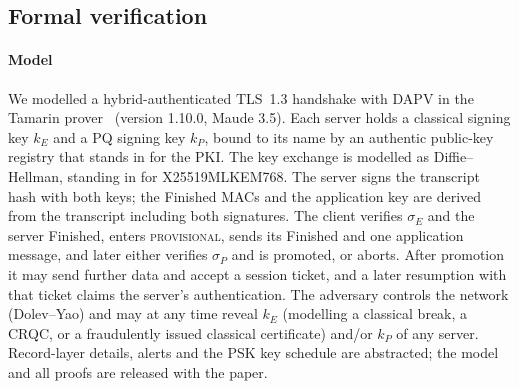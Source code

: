 \documentclass[preprint,10pt,3p]{elsarticle}
\newcommand{\state}[1]{\textsc{#1}}
\begin{document}
\subsection{Formal verification}
\label{sec:formal}

\paragraph{Model} We modelled a hybrid-authenticated TLS~1.3 handshake
with DAPV in the Tamarin prover~\cite{Tamarin2013} (version 1.10.0, Maude
3.5).  Each server holds a classical signing key $k_E$ and a PQ signing key
$k_P$, bound to its name by an authentic public-key registry that stands in
for the PKI.  The key exchange is modelled as Diffie--Hellman, standing in
for X25519MLKEM768.  The server signs the transcript hash with both keys;
the Finished MACs and the application key are derived from the transcript
including both signatures.  The client verifies $\sigma_E$ and the server
Finished, enters \state{provisional}, sends its Finished and one
application message, and later either verifies $\sigma_P$ and is promoted,
or aborts.  After promotion it may send further data and accept a session
ticket, and a later resumption with that ticket claims the server's
authentication.  The adversary controls the network (Dolev--Yao) and may
at any time reveal $k_E$ (modelling a classical break, a CRQC, or a
fraudulently issued classical certificate) and/or $k_P$ of any server.
Record-layer details, alerts and the PSK key schedule are abstracted; the
model and all proofs are released with the paper.
\end{document}
